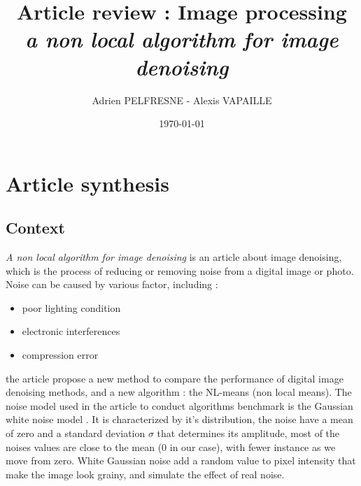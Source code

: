 \documentclass[a4paper, twocolumn, twoside]{article}
\title{Article review : Image processing \\
\textit{a non local algorithm for image denoising}}
\author{Adrien PELFRESNE - Alexis VAPAILLE}
\date{\today}
\begin{document}
\maketitle

\section{Article synthesis}
\subsection{Context}
\textit{A non local algorithm for image denoising} \cite{nlmeans} is an article about image denoising,
which is the process of reducing or removing noise from a digital image or photo.\\
Noise can be caused by various factor, including :
\begin{itemize}
	\item poor lighting condition
	\item electronic interferences
	\item compression error
\end{itemize}
the article propose a new method to compare the performance of digital image denoising methods,
and a new algorithm : the NL-means (non local means).
The noise model used in the article to conduct algorithms benchmark is the Gaussian white noise model \cite{wikigaussiannoise}.
It is characterized by it's distribution,
the noise have a mean of zero and a standard deviation $\sigma$ that determines its amplitude,
most of the noises values are close to the mean (0 in our case), with fewer instance as we move from zero.
White Gaussian noise add a random value to pixel intensity that make the image look grainy, and simulate the effect
of real noise.
\end{document}
